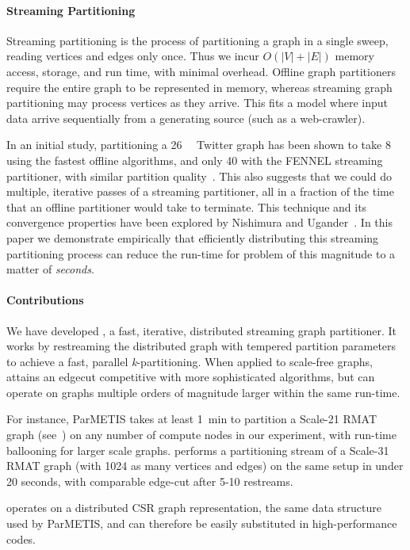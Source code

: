 \paragraph{Streaming Partitioning}
Streaming partitioning is the process of partitioning a graph in a single sweep, reading vertices and edges only once. Thus we incur $O(|V| + |E|)$ memory access, storage, and run time, with minimal overhead. Offline graph partitioners require the entire graph to be represented in memory, whereas streaming graph partitioning may process vertices as they arrive. This fits a model where input data arrive sequentially from a generating source (such as a web-crawler).

In an initial study, partitioning a \SI{26}{\giga\byte} Twitter graph has been shown to take \SI[abbreviations=false]{8}{\hours} using the fastest offline algorithms, and only \SI{40}{\minutes} with the FENNEL streaming partitioner, with similar partition quality~\cite{tsourakakis2012fennel}. This also suggests that we could do multiple, iterative passes of a streaming partitioner, all in a fraction of the time that an offline partitioner would take to terminate. This technique and its convergence properties have been explored by Nishimura and Ugander~\cite{nishimura2013restream}. In this paper we demonstrate empirically that efficiently distributing this streaming partitioning process can reduce the run-time for problem of this magnitude to a matter of \emph{seconds}. 

\paragraph{Contributions}
We have developed \ourmethod, a fast, iterative, distributed streaming graph partitioner.
It works by restreaming the distributed graph with tempered partition parameters to achieve a fast, parallel \textit{k}-partitioning. When applied to scale-free graphs, \ourmethod attains an edgecut competitive with more sophisticated algorithms, but can operate on graphs multiple orders of magnitude larger within the same run-time. 

For instance, ParMETIS takes at least \SI{1}{\minute} to partition a Scale-21 RMAT graph (see~) on any number of compute nodes in our experiment, with run-time ballooning for larger scale graphs. \ourmethod performs a partitioning stream of a Scale-31 RMAT graph (with 1024 as many vertices and edges) on the same setup in under 20 seconds, with comparable edge-cut after 5-10 restreams.

\ourmethod operates on a distributed CSR graph representation, the same data structure used by ParMETIS, and can therefore be easily substituted in high-performance codes. 

